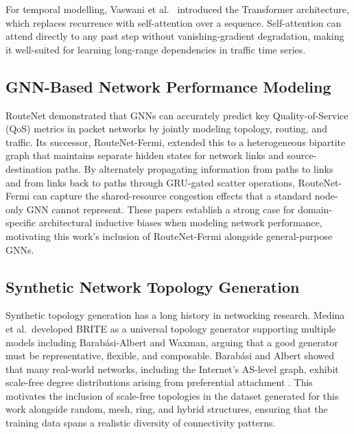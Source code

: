 \documentclass[12pt]{article}
\begin{document}
For temporal modelling, Vaswani et al.\ \cite{transformerVaswani} introduced the Transformer architecture, which replaces recurrence with self-attention over a sequence. Self-attention can attend directly to any past step without vanishing-gradient degradation, making it well-suited for learning long-range dependencies in traffic time series.

\subsection{GNN-Based Network Performance Modeling}
RouteNet \cite{routeNet} demonstrated that GNNs can accurately predict key Quality-of-Service (QoS) metrics in packet networks by jointly modeling topology, routing, and traffic. Its successor, RouteNet-Fermi, extended this to a heterogeneous bipartite graph that maintains separate hidden states for network links and source-destination paths. By alternately propagating information from paths to links and from links back to paths through GRU-gated scatter operations, RouteNet-Fermi can capture the shared-resource congestion effects that a standard node-only GNN cannot represent. These papers establish a strong case for domain-specific architectural inductive biases when modeling network performance, motivating this work's inclusion of RouteNet-Fermi alongside general-purpose GNNs.

\subsection{Synthetic Network Topology Generation}
Synthetic topology generation has a long history in networking research. Medina et al.\ developed BRITE \cite{brite} as a universal topology generator supporting multiple models including Barabási-Albert and Waxman, arguing that a good generator must be representative, flexible, and composable. Barabási and Albert showed that many real-world networks, including the Internet's AS-level graph, exhibit scale-free degree distributions arising from preferential attachment \cite{barabasiAlbert}. This motivates the inclusion of scale-free topologies in the dataset generated for this work alongside random, mesh, ring, and hybrid structures, ensuring that the training data spans a realistic diversity of connectivity patterns.
\end{document}
